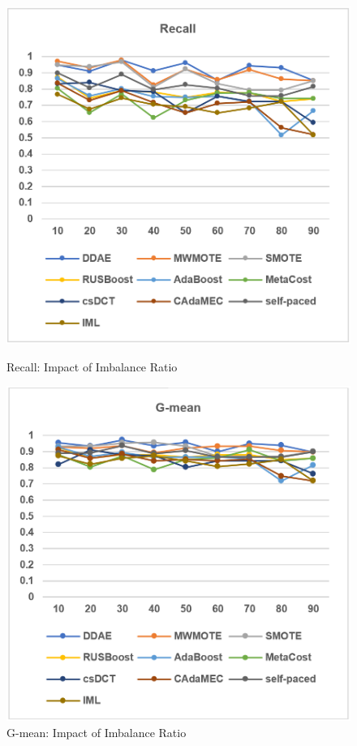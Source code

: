 \begin{figure}[h]
    \centering 
    \begin{minipage}{0.45\textwidth}
        \includegraphics[width=\textwidth]{images/fig13}
        \caption{Recall: Impact of Imbalance Ratio}
        \label{fig13}
    \end{minipage}
    \quad
    \begin{minipage}{0.45\textwidth}
        \vspace{9.5pt}
        \includegraphics[width=\textwidth]{images/fig15}
        \caption{G-mean: Impact of Imbalance Ratio}
        \label{fig15}
    \end{minipage}
\end{figure}

